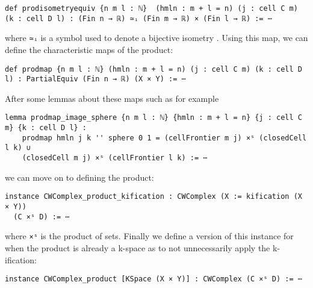 \begin{lstlisting}
def prodisometryequiv {n m l : ℕ}  (hmln : m + l = n) (j : cell C m) (k : cell D l) : (Fin n → ℝ) ≃ᵢ (Fin m → ℝ) × (Fin l → ℝ) := ⋯
\end{lstlisting}

where \lstinline{≃ᵢ} is a symbol used to denote a bijective isometry \href{https://github.com/leanprover-community/mathlib4/blob/ed125a4216d18273cb1b96d4c846d32b85d74faf/Mathlib/Topology/MetricSpace/Isometry.lean#L242-L246}{\faExternalLink}. 
Using this map, we can define the characteristic maps of the product: 
\href{https://github.com/scholzhannah/CWComplexes/blob/7be4872a05b534011cc969eb5b80a4b7f0bf57e2/CWcomplexes/Product.lean#L38-L41}{\faExternalLink}

\begin{lstlisting}
def prodmap {n m l : ℕ} (hmln : m + l = n) (j : cell C m) (k : cell D l) : PartialEquiv (Fin n → ℝ) (X × Y) := ⋯
\end{lstlisting}

After some lemmas about these maps such as for example 
\href{https://github.com/scholzhannah/CWComplexes/blob/7be4872a05b534011cc969eb5b80a4b7f0bf57e2/CWcomplexes/Product.lean#L65-L70}{\faExternalLink}

\begin{lstlisting}
lemma prodmap_image_sphere {n m l : ℕ} {hmln : m + l = n} {j : cell C m} {k : cell D l} :
    prodmap hmln j k '' sphere 0 1 = (cellFrontier m j) ×ˢ (closedCell l k) ∪
    (closedCell m j) ×ˢ (cellFrontier l k) := ⋯
\end{lstlisting}

we can move on to defining the product: 
\href{https://github.com/scholzhannah/CWComplexes/blob/7be4872a05b534011cc969eb5b80a4b7f0bf57e2/CWcomplexes/Product.lean#L226-L377}{\faExternalLink}

\begin{lstlisting}
instance CWComplex_product_kification : CWComplex (X := kification (X × Y)) 
  (C ×ˢ D) := ⋯
\end{lstlisting}

where \lstinline{×ˢ} is the product of sets.
Finally we define a version of this instance for when the product is already a k-space as to not unnecessarily apply the k-ification: 
\href{https://github.com/scholzhannah/CWComplexes/blob/7be4872a05b534011cc969eb5b80a4b7f0bf57e2/CWcomplexes/Product.lean#L81-L224}{\faExternalLink}

\begin{lstlisting}
instance CWComplex_product [KSpace (X × Y)] : CWComplex (C ×ˢ D) := ⋯
\end{lstlisting}